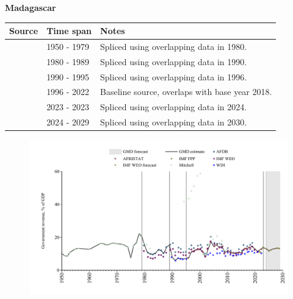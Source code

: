 \documentclass[12pt,a4paper,landscape]{article}
\begin{document}
\begin{adjustbox}{max totalsize={\paperwidth}{\paperheight},center}
\begin{minipage}[t][\textheight][t]{\textwidth}
\vspace*{0.5cm}
{}
\begin{center}
{\Large\bfseries Madagascar}
\end{center}
\vspace{0.5cm}
\begin{table}[H]
\centering
\small
\begin{tabular}{|l|l|l|}
\hline
\textbf{Source} & \textbf{Time span} & \textbf{Notes} \\
\hline
\rowcolor{white}\cite{Mitchell}& 1950 - 1979 &Spliced using overlapping data in 1980.\\
\rowcolor{lightgray}\cite{AFDB}& 1980 - 1989 &Spliced using overlapping data in 1990.\\
\rowcolor{white}\cite{WDI}& 1990 - 1995 &Spliced using overlapping data in 1996.\\
\rowcolor{lightgray}\cite{AFRISTAT}& 1996 - 2022 &Baseline source, overlaps with base year 2018.\\
\rowcolor{white}\cite{IMF_FPP}& 2023 - 2023 &Spliced using overlapping data in 2024.\\
\rowcolor{lightgray}\cite{IMF_WEO_forecast}& 2024 - 2029 &Spliced using overlapping data in 2030.\\
\hline
\end{tabular}
\end{table}
\begin{figure}[H]
\centering
\includegraphics[width=\textwidth,height=0.6\textheight,keepaspectratio]{graphs/MDG_govrev_GDP.pdf}
\end{figure}
\end{minipage}
\end{adjustbox}
\end{document}

